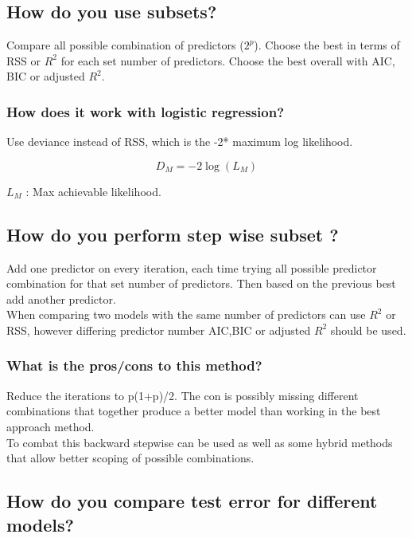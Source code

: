 \documentclass[11pt]{scrartcl} %
\begin{document}
\subsection{How do you use subsets?}

Compare all possible combination of predictors (\(2^p\)). 
Choose the best in terms of RSS or \(R^2\) for each set number of predictors.
Choose the best overall with AIC, BIC or adjusted \(R^2\).

\subsubsection{How does it work with logistic regression?}

Use deviance instead of RSS, which is the -2* maximum log likelihood.

\begin{equation}
	D_{M} = -2 \log (L_M)
\end{equation}

\(L_M\) : Max achievable likelihood.

\subsection{How do you perform step wise subset ?}

Add one predictor on every iteration, each time trying all possible predictor combination for that
set number of predictors. Then based on the previous best add another predictor. \\

When comparing two models with the same number of predictors can use \(R^2\) or RSS, however differing
predictor number AIC,BIC or adjusted \(R^2\) should be used.

\subsubsection{What is the pros/cons to this method?}

Reduce the iterations to p(1+p)/2. The con is possibly missing different combinations that together
produce a better model than working in the best approach method.\\

To combat this backward stepwise can be used as well as some hybrid methods that allow better scoping of
possible combinations.

\subsection{How do you compare test error for different models?}
\end{document}
